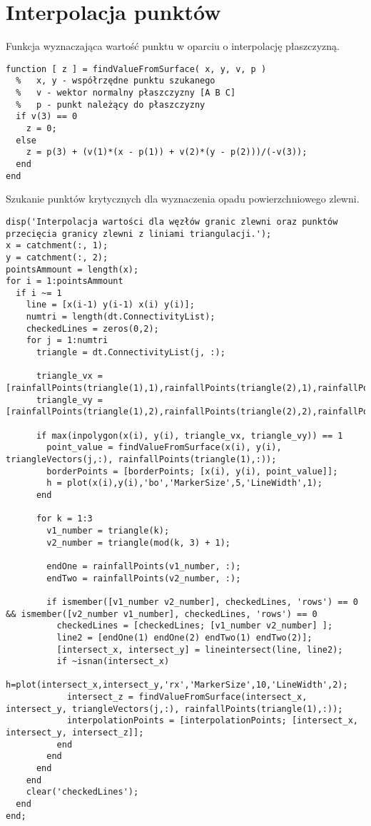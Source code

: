 \section{Interpolacja punktów}

Funkcja wyznaczająca wartość punktu w oparciu o interpolację płaszczyzną.
\begin{lstlisting}
function [ z ] = findValueFromSurface( x, y, v, p )
  %   x, y - współrzędne punktu szukanego
  %   v - wektor normalny płaszczyzny [A B C]
  %   p - punkt należący do płaszczyzny
  if v(3) == 0
    z = 0;
  else
    z = p(3) + (v(1)*(x - p(1)) + v(2)*(y - p(2)))/(-v(3));
  end
end
\end{lstlisting}


Szukanie punktów krytycznych dla wyznaczenia opadu powierzchniowego zlewni.
\begin{lstlisting}
disp('Interpolacja wartości dla węzłów granic zlewni oraz punktów przecięcia granicy zlewni z liniami triangulacji.');
x = catchment(:, 1);
y = catchment(:, 2);
pointsAmmount = length(x);
for i = 1:pointsAmmount
  if i ~= 1
    line = [x(i-1) y(i-1) x(i) y(i)];
    numtri = length(dt.ConnectivityList);
    checkedLines = zeros(0,2);
    for j = 1:numtri
      triangle = dt.ConnectivityList(j, :);

      triangle_vx = [rainfallPoints(triangle(1),1),rainfallPoints(triangle(2),1),rainfallPoints(triangle(3),1)];
      triangle_vy = [rainfallPoints(triangle(1),2),rainfallPoints(triangle(2),2),rainfallPoints(triangle(3),2)];

      if max(inpolygon(x(i), y(i), triangle_vx, triangle_vy)) == 1
        point_value = findValueFromSurface(x(i), y(i), triangleVectors(j,:), rainfallPoints(triangle(1),:));
        borderPoints = [borderPoints; [x(i), y(i), point_value]];
        h = plot(x(i),y(i),'bo','MarkerSize',5,'LineWidth',1);
      end

      for k = 1:3
        v1_number = triangle(k);
        v2_number = triangle(mod(k, 3) + 1);

        endOne = rainfallPoints(v1_number, :);
        endTwo = rainfallPoints(v2_number, :);

        if ismember([v1_number v2_number], checkedLines, 'rows') == 0 && ismember([v2_number v1_number], checkedLines, 'rows') == 0
          checkedLines = [checkedLines; [v1_number v2_number] ];
          line2 = [endOne(1) endOne(2) endTwo(1) endTwo(2)];
          [intersect_x, intersect_y] = lineintersect(line, line2);
          if ~isnan(intersect_x)
            h=plot(intersect_x,intersect_y,'rx','MarkerSize',10,'LineWidth',2);
            intersect_z = findValueFromSurface(intersect_x, intersect_y, triangleVectors(j,:), rainfallPoints(triangle(1),:));
            interpolationPoints = [interpolationPoints; [intersect_x, intersect_y, intersect_z]];
          end
        end
      end
    end
    clear('checkedLines');
  end
end;
\end{lstlisting}



